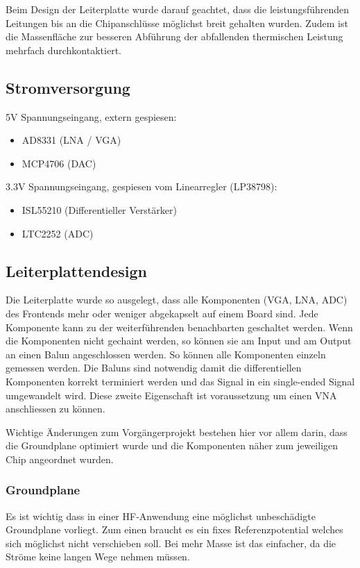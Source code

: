 Beim Design der Leiterplatte wurde darauf geachtet, dass die leistungsführenden Leitungen bis an die Chipanschlüsse möglichst breit gehalten wurden. Zudem ist die Massenfläche zur besseren Abführung der abfallenden thermischen Leistung mehrfach durchkontaktiert.

\subsection{Stromversorgung}
5V Spannungseingang, extern gespiesen:

\begin{itemize}  
	\item AD8331 (LNA / VGA)
	\item MCP4706 (DAC)
\end{itemize}
3.3V Spannungseingang, gespiesen vom Linearregler (LP38798):

\begin{itemize}  
	\item ISL55210 (Differentieller Verstärker)
	\item LTC2252 (ADC)
\end{itemize}


\subsection{Leiterplattendesign}
\label{subsec:Leiterplattendesign}
Die Leiterplatte wurde so ausgelegt, dass alle Komponenten (VGA, LNA, ADC) des Frontends mehr oder weniger abgekapselt auf einem Board sind. Jede Komponente kann zu der weiterführenden benachbarten geschaltet werden. Wenn die Komponenten nicht gechaint werden, so können sie am Input und am Output an einen Balun angeschlossen werden. So können alle Komponenten einzeln gemessen werden. Die Baluns sind notwendig damit die differentiellen Komponenten korrekt terminiert werden und das Signal in ein single-ended Signal umgewandelt wird. Diese zweite Eigenschaft ist voraussetzung um einen VNA anschliessen zu können.

Wichtige Änderungen zum Vorgängerprojekt bestehen hier vor allem darin, dass die Groundplane optimiert wurde und die Komponenten näher zum jeweiligen Chip angeordnet wurden.

\subsubsection*{Groundplane}
Es ist wichtig dass in einer HF-Anwendung eine möglichst unbeschädigte Groundplane vorliegt. Zum einen braucht es ein fixes Referenzpotential welches sich möglichst nicht verschieben soll. Bei mehr Masse ist das einfacher, da die Ströme keine langen Wege nehmen müssen.

